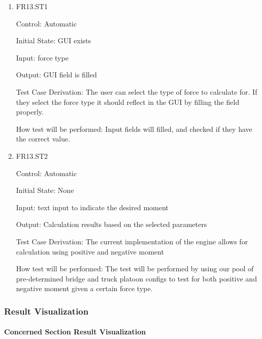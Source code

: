 \documentclass[12pt, titlepage]{article}
\begin{document}
\begin{enumerate}

\item{FR13.ST1\\}

Control: Automatic
					
Initial State: GUI exists
					
Input: force type  
					
Output: GUI field is filled

Test Case Derivation: The user can select the type of force to calculate for. If they select the force type it should reflect in the GUI by filling the field properly.

How test will be performed: Input fields will filled, and checked if they have the correct value.
					
\item{FR13.ST2\\}

Control: Automatic
					
Initial State: None
					
Input: text input to indicate the desired moment  
					 
Output: Calculation results based on the selected parameters 

Test Case Derivation: The current implementation of the engine allows for calculation using positive and negative moment 

How test will be performed: The test will be performed by using our pool of pre-determined bridge and truck platoon configs to test for both positive and negative moment given a certain force type. 

\end{enumerate}

\subsubsection{Result Visualization}

\paragraph{Concerned Section Result Visualization}
\end{document}
